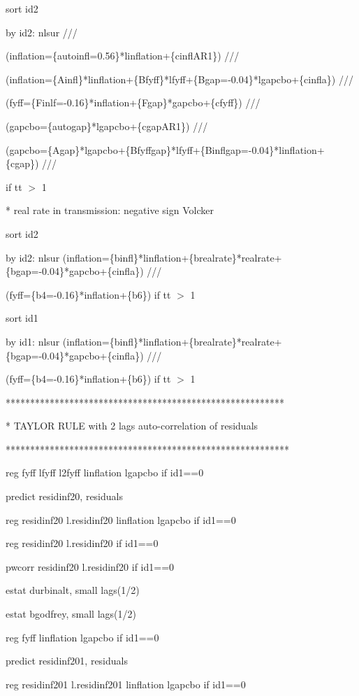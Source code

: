 \documentclass[12pt,a4paper]{article}%
\begin{document}
sort id2

by id2: nlsur ///

(inflation=\{autoinfl=0.56\}*linflation+\{cinflAR1\}) ///

(inflation=\{Ainfl\}*linflation+\{Bfyff\}*lfyff+\{Bgap=-0.04\}*lgapcbo+\{cinfla\})
///

(fyff=\{Finlf=-0.16\}*inflation+\{Fgap\}*gapcbo+\{cfyff\}) ///

(gapcbo=\{autogap\}*lgapcbo+\{cgapAR1\}) ///

(gapcbo=\{Agap\}*lgapcbo+\{Bfyffgap\}*lfyff+\{Binflgap=-0.04\}*linflation+\{cgap\})
///

if tt%
$>$%
1

* real rate in transmission: negative sign Volcker

sort id2

by id2: nlsur
(inflation=\{binfl\}*linflation+\{brealrate\}*realrate+\{bgap=-0.04\}*gapcbo+\{cinfla\})
///

(fyff=\{b4=-0.16\}*inflation+\{b6\}) if tt%
$>$%
1

sort id1

by id1: nlsur
(inflation=\{binfl\}*linflation+\{brealrate\}*realrate+\{bgap=-0.04\}*gapcbo+\{cinfla\})
///

(fyff=\{b4=-0.16\}*inflation+\{b6\}) if tt%
$>$%
1

*********************************************************

* TAYLOR RULE with 2 lags auto-correlation of residuals

**********************************************************

reg fyff lfyff l2fyff linflation lgapcbo if id1==0

predict residinf20, residuals

reg residinf20 l.residinf20 linflation lgapcbo if id1==0

reg residinf20 l.residinf20 if id1==0

pwcorr residinf20 l.residinf20 if id1==0

estat durbinalt, small lags(1/2)

estat bgodfrey, small lags(1/2)

reg fyff linflation lgapcbo if id1==0

predict residinf201, residuals

reg residinf201 l.residinf201 linflation lgapcbo if id1==0
\end{document}
